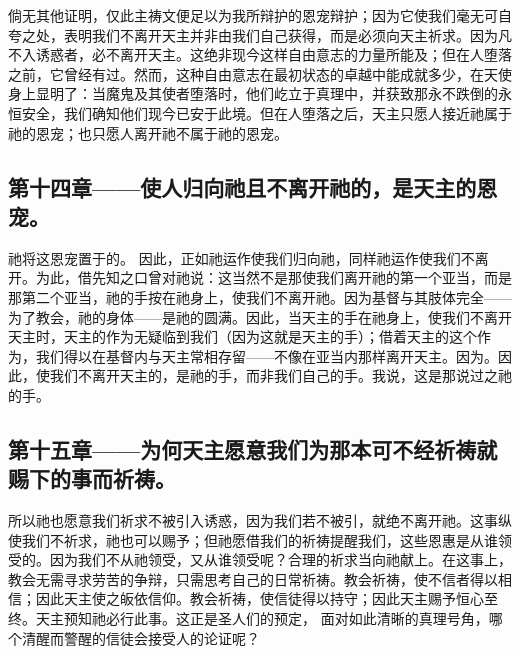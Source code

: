 倘无其他证明，仅此主祷文便足以为我所辩护的恩宠辩护；因为它使我们毫无可自夸之处，表明我们不离开天主并非由我们自己获得，而是必须向天主祈求。因为凡不入诱惑者，必不离开天主。这绝非现今这样自由意志的力量所能及；但在人堕落之前，它曾经有过。然而，这种自由意志在最初状态的卓越中能成就多少，在天使身上显明了：当魔鬼及其使者堕落时，他们屹立于真理中，并获致那永不跌倒的永恒安全，我们确知他们现今已安于此境。但在人堕落之后，天主只愿人接近祂属于祂的恩宠；也只愿人离开祂不属于祂的恩宠。\par


\subsection{第十四章——使人归向祂且不离开祂的，是天主的恩宠。}

祂将这恩宠置于的。 因此，正如祂运作使我们归向祂，同样祂运作使我们不离开。为此，借先知之口曾对祂说：这当然不是那使我们离开祂的第一个亚当，而是那第二个亚当，祂的手按在祂身上，使我们不离开祂。因为基督与其肢体完全——为了教会，祂的身体——是祂的圆满。因此，当天主的手在祂身上，使我们不离开天主时，天主的作为无疑临到我们（因为这就是天主的手）；借着天主的这个作为，我们得以在基督内与天主常相存留——不像在亚当内那样离开天主。因为。因此，使我们不离开天主的，是祂的手，而非我们自己的手。我说，这是那说过之祂的手。\par


\subsection{第十五章——为何天主愿意我们为那本可不经祈祷就赐下的事而祈祷。}

所以祂也愿意我们祈求不被引入诱惑，因为我们若不被引，就绝不离开祂。这事纵使我们不祈求，祂也可以赐予；但祂愿借我们的祈祷提醒我们，这些恩惠是从谁领受的。因为我们不从祂领受，又从谁领受呢？合理的祈求当向祂献上。在这事上，教会无需寻求劳苦的争辩，只需思考自己的日常祈祷。教会祈祷，使不信者得以相信；因此天主使之皈依信仰。教会祈祷，使信徒得以持守；因此天主赐予恒心至终。天主预知祂必行此事。这正是圣人们的预定， 面对如此清晰的真理号角，哪个清醒而警醒的信徒会接受人的论证呢？\par

